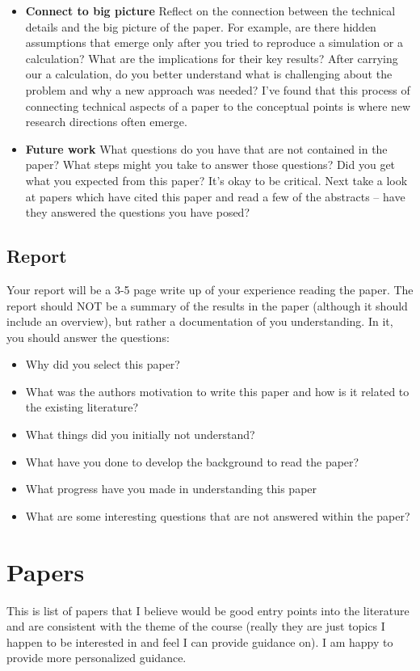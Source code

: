 \documentclass{amsart}
\begin{document}
\begin{itemize}
\begin{itemize}
\end{itemize}
\item  {\bf Connect to big picture} Reflect on the connection between the technical details and the big picture of the paper. For example, are there hidden assumptions that emerge only after you tried to reproduce a simulation or a calculation? What are the implications for their key results? After carrying our a calculation, do you better understand what is challenging about the problem and why a new approach was needed? I've found that this process of connecting technical aspects of a paper to the conceptual points is where new research directions often emerge. 
\item  {\bf Future work}  What questions do you have that are not contained in the paper?  What steps might you take to answer those questions? Did you get what you expected from this paper? It's okay to be critical. Next take a look at papers which have cited this paper and read a few of the abstracts -- have they answered the questions you have posed?
\end{itemize}

\subsection{Report}

Your report will be a 3-5 page write up of your experience reading the paper. The report should NOT be a summary of the results in the paper (although it should include an overview), but rather a documentation of you understanding. In it, you should answer the questions:
\begin{itemize}
\item  Why did you select this paper?   
\item  What was the authors motivation to write this paper and how is it related to the existing literature? 
\item  What things did you initially not understand? 
\item  What have you done to develop the background to read the paper? 
\item  What progress have you made in understanding this paper 
\item  What are some interesting questions that are not answered within the paper?   
\end{itemize}

\section{Papers}\label{sec:papers}
This is list of papers that I believe would be good entry points into the literature and are consistent with the theme of the course (really they are just topics I happen to be interested in and feel I can provide guidance on).  I am happy to provide more personalized guidance. 
\end{document}
